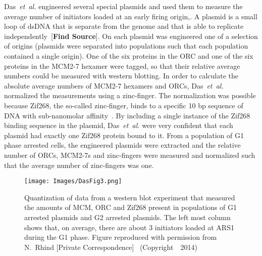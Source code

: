 {		Das~\emph{et~al.} engineered several special plasmids and used them to measure the average number of initiators loaded at an early firing origin,.
		A plasmid is a small loop of dsDNA that is separate from the genome and that is able to replicate independently~[\textbf{Find Source}].
		On each plasmid was engineered one of a selection of origins (plasmids were separated into populations such that each population contained a single origin).
		One of the six proteins in the ORC and one of the six proteins in the MCM2-7 hexamer were tagged, so that their relative average numbers could be measured with western blotting.
		In order to calculate the absolute average numbers of MCM2-7 hexamers and ORCs, Das~\emph{et~al.} normalized the measurements using a zinc-finger.
		The normalization was possible because Zif268, the so-called zinc-finger, binds to a specific 10 bp sequence of DNA with sub-nanomolar affinity~\cite{ZincFingers}.
		By including a single instance of the Zif268 binding sequence in the plasmid, Das~\emph{et~al.} were very confident that each plasmid had exactly one Zif268 protein bound to it.
		From a population of G1 phase arrested cells, the engineered plasmids were extracted and the relative number of ORCs, MCM2-7s and zinc-fingers were measured and normalized such that the average number of zinc-fingers was one.
		
		\begin{SCfigure}[1][tbh]
			\texttt{[image: Images/DasFig3.png]}
			\caption[Absolute number of loaded MCMs at ARS1]{\label{fig:Das3} Quantization of data from a western blot experiment that measured the amounts of MCM, ORC and Zif268 present in populations of G1 arrested plasmids and G2 arrested plasmids.
				The left most column shows that, on average, there are about 3 initiators loaded at ARS1 during the G1 phase.
				Figure reproduced with permission from N.~Rhind [Private Correspondence]~\cite{Rhind} (Copyright~\textcopyright~2014)}
		\end{SCfigure}
		
}
